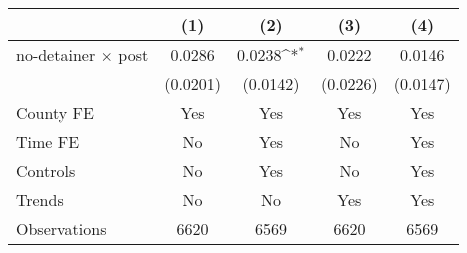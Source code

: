 {
\def\sym#1{\ifmmode^{#1}\else\(^{#1}\)\fi}
\begin{tabular*}{0.7\textwidth}{@{\hskip\tabcolsep\extracolsep\fill}l*{4}{c}}
\hline\hline
                    &\multicolumn{1}{c}{(1)}         &\multicolumn{1}{c}{(2)}         &\multicolumn{1}{c}{(3)}         &\multicolumn{1}{c}{(4)}         \\
\hline
no-detainer $\times$ post&      0.0286         &      0.0238\sym{*}  &      0.0222         &      0.0146         \\
                    &    (0.0201)         &    (0.0142)         &    (0.0226)         &    (0.0147)         \\
[1em]
County FE           &         Yes         &         Yes         &         Yes         &         Yes         \\
[1em]
Time FE             &          No         &         Yes         &          No         &         Yes         \\
[1em]
Controls            &          No         &         Yes         &          No         &         Yes         \\
[1em]
Trends              &          No         &          No         &         Yes         &         Yes         \\
\hline
Observations        &        6620         &        6569         &        6620         &        6569         \\
\hline\hline
\end{tabular*}
}

